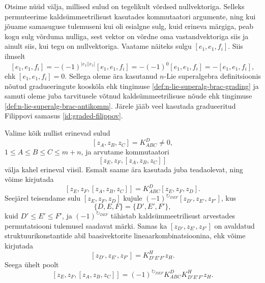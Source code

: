 Otsime nüüd välja, millised sulud on tegelikult võrdsed nullvektoriga. Selleks
permuteerime kaldsümmeetrilisust kasutades kommutaatori argumente, ning kui
jõuame samasuguse tulemuseni kui oli esialgne sulg, kuid erineva märgiga,
peab kogu sulg võrduma nulliga, sest vektor on võrdne oma vastandvektoriga
siis ja ainult siis, kui tegu on nullvektoriga. Vaatame näiteks sulgu
$[e_1, e_1, f_i]$. Siis ilmselt
\[
    [e_1, e_1, f_i] = -(-1)^{|e_1||e_1|} [e_1, e_1, f_i] =
    -(-1)^0 [e_1, e_1, f_i] = - [e_1, e_1, f_i],
\]
ehk $[e_1, e_1, f_i] = 0$.
Sellega oleme ära kasutanud $n$-Lie superalgebra definitsioonis nõutud
gradueeringute kooskõla ehk tingimuse \eqref{def:n-lie-superalg-brac-grading}
ja samuti oleme juba tarvitusele võtnud kaldsümmeetrilisuse nõude ehk
tingimuse \eqref{def:n-lie-superalg-brac-antikomm}. Järele jääb veel kasutada
gradueeritud Filippovi samasus \eqref{id:graded-filippov}.

Valime kõik nullist erinevad sulud
\[ [z_A, z_B, z_C] = K_{ABC}^D \ne 0, \]
$1 \leq A \leq B \leq C \leq m+n$, ja arvutame kommutaatori
\[ \left[ z_E, z_F, [z_A, z_B, z_C] \right] \]
välja kahel erineval viisil. Esmalt saame ära kasutada juba teadaolevat,
ning võime kirjutada
\[
    \left[ z_E, z_F, [z_A, z_B, z_C] \right] = K_{ABC}^D [z_E, z_F, z_D].
\]
Seejärel teisendame sulu $[z_E, z_F, z_D]$ kujule
$(-1)^{\circlearrowright_{DEF}} [z_{D'}, z_{E'}, z_{F'}]$, kus
\[ \{D, E, F\} = \{D', E', F'\}, \]
kuid $D' \leq E' \leq F'$, ja  $(-1)^{\circlearrowright_{DEF}}$ tähistab
kaldsümmeetrilisust arvestades permutatsiooni tulemusel saadavat märki.
Samas ka $[z_{D'}, z_{E'}, z_{F'}]$ on avaldatud struktuurikonstantide
abil baasivektorite lineaarkombinatsioonina, ehk võime kirjutada
\[
    [z_{D'}, z_{E'}, z_{F'}] =
    K_{D' E' F'}^H z_H.
\]
Seega ühelt poolt
\[
    \left[ z_E, z_F, [z_A, z_B, z_C] \right] =
    (-1)^{\circlearrowright_{DEF}} K_{ABC}^D K_{D' E' F'}^H z_H.
\]

